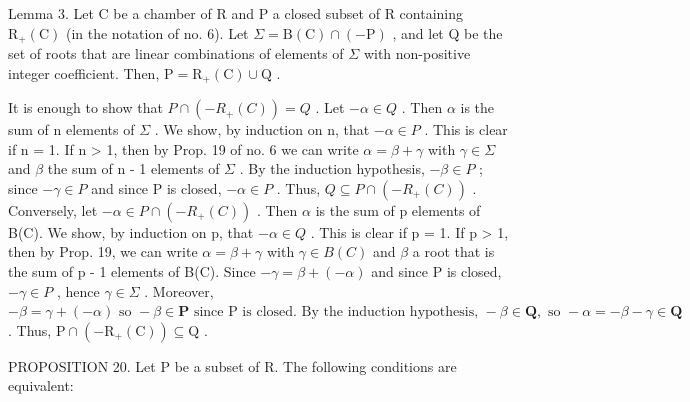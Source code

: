 Lemma 3. Let C be a chamber of R and P a closed subset of R containing \(\mathrm{R}_{+}(\mathrm{C})\) (in the notation of no. 6). Let \(\Sigma = \mathrm{B}(\mathrm{C}) \cap (-\mathrm{P})\) , and let Q be the set of roots that are linear combinations of elements of \(\Sigma\) with non-positive integer coefficient. Then, \(\mathrm{P} = \mathrm{R}_{+}(\mathrm{C}) \cup \mathrm{Q}\) .

It is enough to show that \(P \cap (-R_{+}(C)) = Q\) . Let \(-\alpha \in Q\) . Then \(\alpha\) is the sum of n elements of \(\Sigma\) . We show, by induction on n, that \(-\alpha \in P\) . This is clear if n = 1. If n \textgreater{} 1, then by Prop. 19 of no. 6 we can write \(\alpha = \beta + \gamma\) with \(\gamma \in \Sigma\) and \(\beta\) the sum of n - 1 elements of \(\Sigma\) . By the induction hypothesis, \(-\beta \in P\) ; since \(-\gamma \in P\) and since P is closed, \(-\alpha \in P\) . Thus, \(Q \subseteq P \cap (-R_{+}(C))\) . Conversely, let \(-\alpha \in P \cap (-R_{+}(C))\) . Then \(\alpha\) is the sum of p elements of B(C). We show, by induction on p, that \(-\alpha \in Q\) . This is clear if p = 1. If p \textgreater{} 1, then by Prop. 19, we can write \(\alpha = \beta + \gamma\) with \(\gamma \in B(C)\) and \(\beta\) a root that is the sum of p - 1 elements of B(C). Since \(-\gamma = \beta + (-\alpha)\) and since P is closed, \(-\gamma \in P\) , hence \(\gamma \in \Sigma\) . Moreover, \(-\beta = \gamma + (-\alpha) \text{ so } -\beta \in \mathbf{P} \text{ since P is closed. By the induction hypothesis, } -\beta \in \mathbf{Q}, \text{ so } -\alpha = -\beta - \gamma \in \mathbf{Q}\) . Thus, \(\mathrm{P} \cap (-\mathrm{R}_{+}(\mathrm{C})) \subseteq \mathrm{Q}\) .

PROPOSITION 20. Let P be a subset of R. The following conditions are equivalent:

